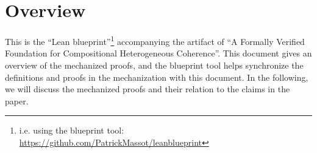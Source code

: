 %

\chapter{Overview}

This is the ``Lean blueprint''\footnote{i.e. using the blueprint tool: \url{https://github.com/PatrickMassot/leanblueprint}} accompanying the artifact of ``A Formally Verified Foundation for Compositional Heterogeneous Coherence''.
This document gives an overview of the mechanized proofs, and the blueprint tool helps synchronize the definitions and proofs in the mechanization with this document.
In the following, we will discuss the mechanized proofs and their relation to the claims in the paper.

